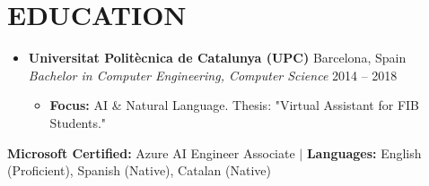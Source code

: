 \documentclass[letterpaper,11pt]{article}
\newcommand{\resumeItem}[1]{
  \item{\small
    {#1 \vspace{-1pt}}
  }
}
\newcommand{\resumeSubheading}[4]{
  \vspace{-1pt}\item
    \textbf{#1} \hfill {\color{dark-grey}\small #2}\vspace{2pt}\\
    \textit{#3} \hfill {\color{dark-grey} \small #4}\vspace{-4pt}
}
\newcommand{\resumeSubHeadingListStart}{\begin{itemize}[leftmargin=0in, label={}]}
\newcommand{\resumeSubHeadingListEnd}{\end{itemize}}
\newcommand{\resumeItemListStart}{\begin{itemize}}
\newcommand{\resumeItemListEnd}{\end{itemize}\vspace{0pt}}
\begin{document}
\section{EDUCATION}
  \resumeSubHeadingListStart
    \resumeSubheading
      {Universitat Politècnica de Catalunya (UPC)}{Barcelona, Spain}
      {Bachelor in Computer Engineering, Computer Science}{2014 -- 2018}
      \resumeItemListStart
        \resumeItem{\textbf{Focus:} AI \& Natural Language. Thesis: "Virtual Assistant for FIB Students."}
      \resumeItemListEnd
  \resumeSubHeadingListEnd
  \vspace{2pt}
  \hspace{1pt} \textbf{Microsoft Certified:} Azure AI Engineer Associate $|$ \textbf{Languages:} English (Proficient), Spanish (Native), Catalan (Native)
\end{document}
